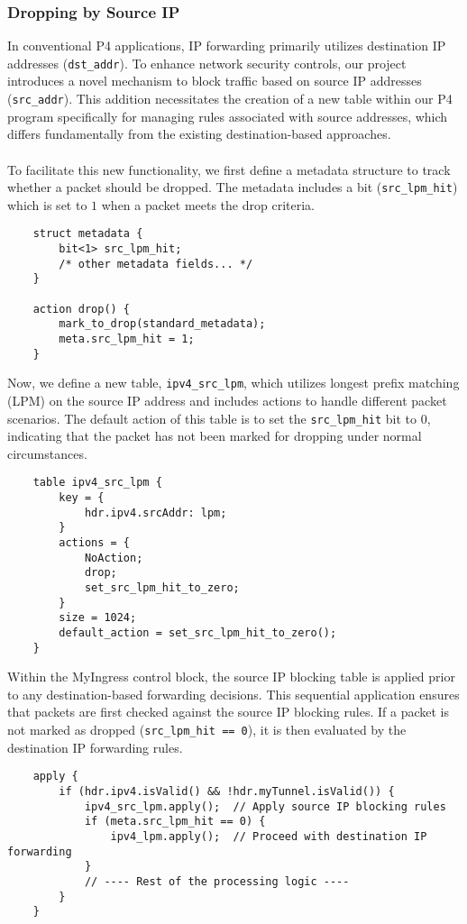 \subsubsection{Dropping by Source IP}
In conventional P4 applications, IP forwarding primarily utilizes destination IP addresses (\verb|dst_addr|). To enhance network security controls, our project introduces a novel mechanism to block traffic based on source IP addresses (\verb|src_addr|). This addition necessitates the creation of a new table within our P4 program specifically for managing rules associated with source addresses, which differs fundamentally from the existing destination-based approaches.\\
\\
To facilitate this new functionality, we first define a metadata structure to track whether a packet should be dropped. The metadata includes a bit (\verb|src_lpm_hit|) which is set to $1$ when a packet meets the drop criteria.
\begin{lstlisting}
    struct metadata {
        bit<1> src_lpm_hit;
        /* other metadata fields... */
    }
    
    action drop() {
        mark_to_drop(standard_metadata);
        meta.src_lpm_hit = 1;
    }
\end{lstlisting}
Now, we define a new table, \verb|ipv4_src_lpm|, which utilizes longest prefix matching (LPM) on the source IP address and includes actions to handle different packet scenarios. The default action of this table is to set the \verb|src_lpm_hit| bit to 0, indicating that the packet has not been marked for dropping under normal circumstances.
\begin{lstlisting}
    table ipv4_src_lpm {
        key = {
            hdr.ipv4.srcAddr: lpm;
        }
        actions = {
            NoAction;
            drop;
            set_src_lpm_hit_to_zero;
        }
        size = 1024;
        default_action = set_src_lpm_hit_to_zero();
    }
\end{lstlisting}
Within the MyIngress control block, the source IP blocking table is applied prior to any destination-based forwarding decisions. This sequential application ensures that packets are first checked against the source IP blocking rules. If a packet is not marked as dropped (\verb|src_lpm_hit == 0|), it is then evaluated by the destination IP forwarding rules.
\begin{lstlisting}
    apply {
        if (hdr.ipv4.isValid() && !hdr.myTunnel.isValid()) {
            ipv4_src_lpm.apply();  // Apply source IP blocking rules
            if (meta.src_lpm_hit == 0) {
                ipv4_lpm.apply();  // Proceed with destination IP forwarding
            }
            // ---- Rest of the processing logic ----
        }
    }
\end{lstlisting}
